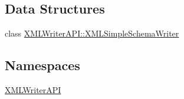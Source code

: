 \subsection*{Data Structures}
\begin{DoxyCompactItemize}
\item 
class \mbox{\hyperlink{classXMLWriterAPI_1_1XMLSimpleSchemaWriter}{X\+M\+L\+Writer\+A\+P\+I\+::\+X\+M\+L\+Simple\+Schema\+Writer}}
\end{DoxyCompactItemize}
\subsection*{Namespaces}
\begin{DoxyCompactItemize}
\item 
 \mbox{\hyperlink{namespaceXMLWriterAPI}{X\+M\+L\+Writer\+A\+PI}}
\end{DoxyCompactItemize}
